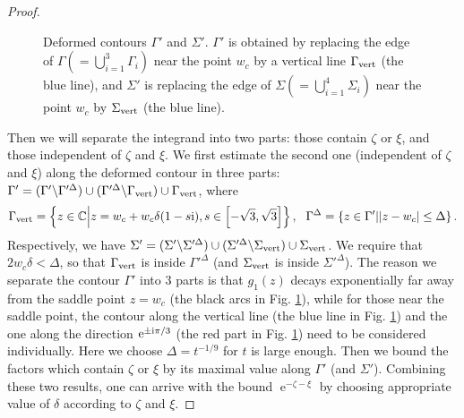 \documentclass[cmp]{svjour}
\numberwithin{theorem}{section}
\numberwithin{equation}{section}
\DeclareMathOperator{\e}{e}
\def\ii{{\rm i}}
\begin{document}
\begin{proof}
\begin{figure}[h]
\begin{center}
\end{center}
\caption{Deformed contours $\Gamma'$ and $\Sigma'$. $\Gamma'$ is obtained by replacing the edge of $\Gamma (=\bigcup_{i=1}^3 \Gamma_i)$ near the point $w_c$ by a vertical line $\Gamma_{\rm vert}$ (the blue line), and $\Sigma'$ is replacing the edge of $\Sigma (=\bigcup_{i=1}^4 \Sigma_i)$ near the point $w_c$ by $\Sigma_{\rm vert}$ (the blue line).}
\label{Fig.CotourWhole1_text}
\end{figure}	


Then we will separate the integrand into two parts: those contain $\zeta$ or $\xi$, and those independent of $\zeta$ and $\xi$. We first estimate the second one (independent of $\zeta$ and $\xi$) along the deformed contour in three parts: $\Gamma'=(\Gamma' \backslash \Gamma'^{\Delta})  \cup (\Gamma'^{\Delta} \backslash \Gamma_{\rm vert}) \cup \Gamma_{\rm vert}$, where 
\[
\Gamma_{\rm vert} = \left\{ z \in \mathbb{C} \middle| z = w_c + w_c \delta (1 - s \ii) , s \in \left[  -\sqrt{3} , \sqrt{3} \right]  \right\} ,
\,\,\,\,
\Gamma^{\Delta} = \left\{ z \in \Gamma' \middle| |z-w_c| \leq \Delta  \right\}.
\]
Respectively, we have $\Sigma'=(\Sigma' \backslash \Sigma'^{\Delta})  \cup (\Sigma'^{\Delta} \backslash \Sigma_{\rm vert}) \cup \Sigma_{\rm vert}$. We require that $2w_c\delta < \Delta$, so that $\Gamma_{\rm vert}$ is inside $\Gamma'^{\Delta}$ (and $\Sigma_{\rm vert}$ is inside $\Sigma'^{\Delta}$). The reason we separate the contour $\Gamma'$ into 3 parts is that $g_1(z)$ decays exponentially far away from the saddle point $z=w_c$ (the black arcs in Fig. \ref{Fig.CotourWhole1_text}), while for those near the saddle point, the contour along the vertical line (the blue line in Fig. \ref{Fig.CotourWhole1_text}) and the one along the direction $\e^{\pm \ii \pi / 3}$ (the red part in Fig. \ref{Fig.CotourWhole1_text}) need to be considered individually. Here we choose $\Delta = t^{-1/9}$ for $t$ is large enough. 
Then we bound the factors which contain $\zeta$ or $\xi$ by its maximal value along $\Gamma'$ (and $\Sigma'$). Combining these two results, one can arrive with the bound $\e^{-\zeta-\xi}$ by choosing appropriate value of $\delta$ according to $\zeta$ and $\xi$. 


\end{proof}
\end{document}
